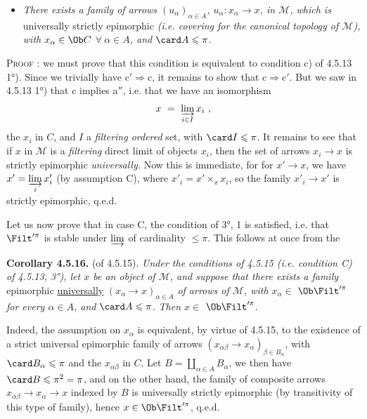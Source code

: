 \begin{itemize}
\item[\textit{c$'$)}] \textit{There exists a family of arrows $(u_{\alpha})_{\alpha\in A}$, $u_{\alpha} : x_{\alpha} \longrightarrow x$, in $\mathcal{M}$, which is} universally strictly epimorphic \textit{(i.e. covering for the canonical topology of $\mathcal{M}$), with $x_{\alpha} \in \Ob C$ $\forall\ \alpha \in A$, and} $\card A \leqslant \pi$.
\end{itemize}
\textsc{Proof} : we must prove that this condition is equivalent to condition c) of 4.5.13 1°). Since we trivially have $\mathrm{c}' \Longrightarrow \mathrm{c}$, it remains to show that $\mathrm{c} \Longrightarrow \mathrm{c}'$. But we saw in 4.5.13 1°) that c implies a$''$, i.e. that we have an isomorphism
\[ x \ = \ \varinjlim_{i\in I} x_i \ , \]
the $x_i$ in $C$, and $I$ a \textit{filtering ordered} set, with $\card I \leqslant \pi$. It remains to see that if $x$ in $\mathcal{M}$ is a \textit{filtering} direct limit of objects $x_i$, then the set of arrows $x_i \longrightarrow x$ is strictly epimorphic \textit{universally.} Now this is immediate, for for $x' \longrightarrow x$, we have $x' = \varinjlim\limits_{i} x'_i$ (by assumption C), where $x'_i = x' \times_x x_i$, so the family $x'_i \longrightarrow x'$ is strictly epimorphic, q.e.d.

Let us now prove that in case C, the condition of 3°, 1 is satisfied, i.e. that $\Filt'^{\pi}$ is stable under $\varinjlim$ of cardinality $\leqslant \pi$. This
follows at once from the

\textbf{Corollary 4.5.16.} (of 4.5.15). \textit{Under the conditions of 4.5.15 (i.e. condition C) of 4.5.13, 3°), let $x$ be an object of $\mathcal{M}$, and suppose that there exists a family} epimorphic \underline{universally} $(x_{\alpha} \longrightarrow x)_{\alpha\in A}$ \textit{of arrows of $\mathcal{M}$, with $x_{\alpha} \in$} $\Ob \Filt'^{\pi}$ \textit{for every $\alpha \in A$, and} $\card A \leqslant \pi$. \textit{Then $x \in$} $\Ob \Filt'^{\pi}$.

Indeed, the assumption on $x_{\alpha}$ is equivalent, by virtue of 4.5.15, to the existence of a strict universal epimorphic family of arrows $(x_{\alpha\beta} \longrightarrow x_{\alpha})_{\beta\in B_{\alpha}}$, with $\card B_{\alpha} \leqslant \pi$ and the $x_{\alpha\beta}$ in $C$. Let $B = \coprod_{\alpha\in A} B_{\alpha}$, we then have $\card B \leqslant \pi^2 = \pi$, and on the other hand, the family of composite arrows $x_{\alpha\beta} \longrightarrow x_{\alpha} \longrightarrow x$ indexed by $B$ is universally strictly epimorphic (by transitivity of this type of family), hence $x \in \Ob \Filt'^{\pi}$, q.e.d.

